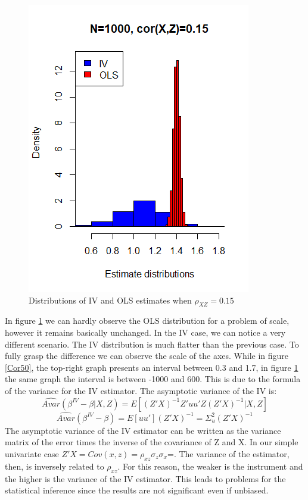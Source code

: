 \documentclass[a4paper,12pt,oneside,English]{article}
\begin{document}
\begin{figure}[p!]
\begin{minipage}[b]{0.5\linewidth}
        \includegraphics[width=\linewidth]{Fig4A.png}
    \end{minipage}\hfill
    \label{cor15}
    \caption{Distributions of IV and OLS estimates when $\rho_{XZ}=0.15$}
\end{figure}

In figure \ref{cor15} we can hardly observe the OLS distribution for a problem of scale, however it remains basically unchanged. In the IV case, we can notice a very different scenario. The IV distribution is much flatter than the previous case. To fully grasp the difference we can observe the scale of the axes. While in figure \ref{Cor50}, the top-right graph presents an interval between 0.3 and 1.7, in figure \ref{cor15} the same graph the interval is between -1000 and 600. This is due to the formula of the variance for the IV estimator. The asymptotic variance of the IV is:
\[
\widehat{Avar}(\beta^{IV}-\beta|X,Z)=E[(Z'X)^{-1}Z'uu'Z(Z'X)^{-1}|X,Z]
\]
\[
\widehat{Avar}(\beta^{IV}-\beta)=E[uu'](Z'X)^{-1}=\Sigma^2_u(Z'X)^{-1}
\]
The asymptotic variance of the IV estimator can be written as the variance matrix of the error times the inverse of the covariance of Z and X. In our simple univariate case $Z'X=Cov(x,z)=\rho_{xz}\sigma_z\sigma_x$=. The variance of the estimator, then, is inversely related to $\rho_{xz}$. For this reason, the weaker is the instrument and the higher is the variance of the IV estimator. This leads to problems for the statistical inference since the results are not significant even if unbiased.
\end{document}
